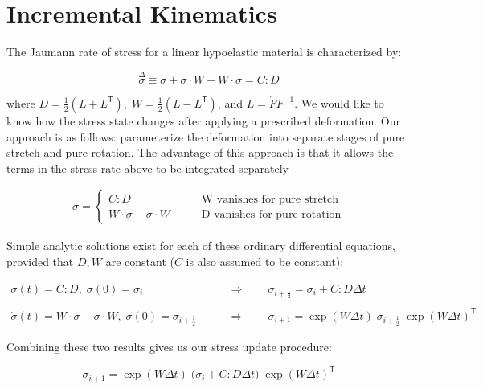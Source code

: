 \section{Incremental Kinematics}
%


\newcommand{\ds}{\displaystyle}
\newcommand{\mparen}[1]{\displaystyle \big( #1 \big)}
\newcommand{\mbrack}[1]{\displaystyle \big[ #1 \big]}
\newcommand{\bparen}[1]{\displaystyle \bigg( #1 \bigg)}
\newcommand{\bbrack}[1]{\displaystyle \bigg[ #1 \bigg]}

The Jaumann rate of stress for a linear hypoelastic material is characterized by:

$$ \overset{\Delta}{\sigma} \equiv 
\dot{\sigma} + \sigma \cdot W - W \cdot \sigma = 
C : D $$

where $ D = \frac{1}{2} (L + L^{\mathsf{T}}), \; W = \frac{1}{2} (L - L^{\mathsf{T}})$, and $L = \dot{F}
F^{-1} $. We would like to know how the stress state changes after applying
a prescribed deformation. Our approach is as follows: parameterize the deformation
into separate stages of pure stretch and pure rotation. The advantage of this
approach is that it allows the terms in the stress rate above to be integrated
separately

\begin{align*}
\dot{\sigma} = 
\begin{cases}
C : D & \qquad \text{W vanishes for pure stretch} \\
W \cdot \sigma - \sigma \cdot W & \qquad \text{D vanishes for pure rotation}
\end{cases}
\end{align*}

Simple analytic solutions exist for each of these ordinary differential equations, 
provided that $D, W$ are constant ($C$ is also assumed to be constant):

\begin{align*}
\dot{\sigma}(t) = C : D, \; \sigma(0) = \sigma_i 
\qquad 
& \Longrightarrow 
\qquad 
\sigma_{i+\frac{1}{2}}  = \sigma_i + C : D \Delta t \\ \\
\dot{\sigma}(t) = W \cdot \sigma - \sigma \cdot W, \; \sigma(0) = \sigma_{i+\frac{1}{2}} 
\qquad 
& \Longrightarrow 
\qquad 
\sigma_{i+1} = \exp(W \Delta t) \; \sigma_{i+\frac{1}{2}} \; \exp(W \Delta t)^{{\mathsf{T}}}
\end{align*}

Combining these two results gives us our stress update procedure:

$$ \sigma_{i+1} = \exp(W \Delta t) \; \bparen{\sigma_i + C : D \Delta t} \; \exp(W \Delta t)^{{{\mathsf{T}}}} $$

